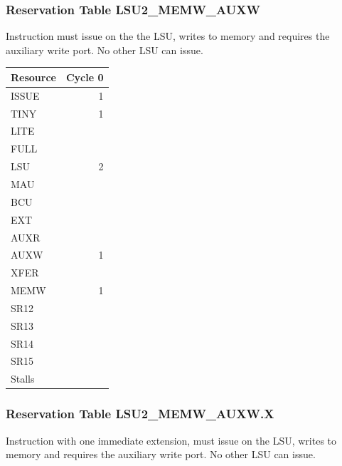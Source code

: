 \subsubsection{Reservation Table LSU2\_MEMW\_AUXW} \label{sec:reservation-LSU2-MEMW-AUXW}

Instruction must issue on the the LSU, writes to memory and requires the auxiliary write port. No other LSU can issue.
\medskip

\begin{tabular}{|l|r|} \hline
Resource	& Cycle 0 \\ \hline
\textsf{ISSUE}	& 1	\\
\textsf{TINY}	& 1	\\
\textsf{LITE}	& 	\\
\textsf{FULL}	& 	\\
\textsf{LSU}	& 2	\\
\textsf{MAU}	& 	\\
\textsf{BCU}	& 	\\
\textsf{EXT}	& 	\\
\textsf{AUXR}	& 	\\
\textsf{AUXW}	& 1	\\
\textsf{XFER}	& 	\\
\textsf{MEMW}	& 1	\\
\textsf{SR12}	& 	\\
\textsf{SR13}	& 	\\
\textsf{SR14}	& 	\\
\textsf{SR15}	& 	\\
\hline Stalls	& 	\\
\hline \end{tabular}

\subsubsection{Reservation Table LSU2\_MEMW\_AUXW.X} \label{sec:reservation-LSU2-MEMW-AUXW.X}

Instruction with one immediate extension, must issue on the LSU, writes to memory and requires the auxiliary write port. No other LSU can issue.
\medskip

